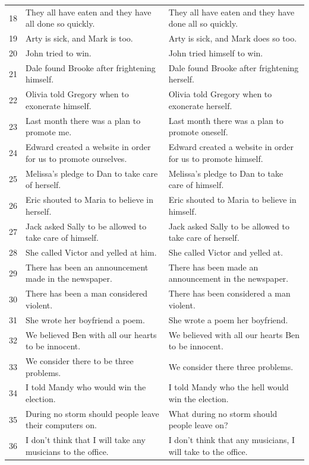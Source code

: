 \documentclass[doc]{apa6}
\begin{document}
\begin{small}
\begin{longtable}{p{1cm} | p{8.5cm} | p{8.5cm}}
18 & They all have eaten and they have all done so quickly. & They all have eaten and they have done all so quickly.\\
19 & Arty is sick, and Mark is too. & Arty is sick, and Mark does so too.\\
20 & John tried to win. & John tried himself to win.\\
21 & Dale found Brooke after frightening himself.  & Dale found Brooke after frightening herself. \\
22 & Olivia told Gregory when to exonerate himself. & Olivia told Gregory when to exonerate herself.\\
23 & Last month there was a plan to promote me. & Last month there was a plan to promote oneself.\\
24 & Edward created a website in order for us to promote ourselves. & Edward created a website in order for us to promote himself.\\
25 & Melissa's pledge to Dan to take care of herself. & Melissa's pledge to Dan to take care of himself.\\
26 & Eric shouted to Maria to believe in herself. & Eric shouted to Maria to believe in himself.\\
27 & Jack asked Sally to be allowed to take care of himself. & Jack asked Sally to be allowed to take care of herself.\\
28 & She called Victor and yelled at him. & She called Victor and yelled at.\\
29 & There has been an announcement made in the newspaper. & There has been made an announcement in the newspaper.\\
30 & There has been a man considered violent. & There has been considered a man violent.\\
31 & She wrote her boyfriend a poem. & She wrote a poem her boyfriend.\\
32 & We believed Ben with all our hearts to be innocent. & We believed with all our hearts Ben to be innocent.\\
33 & We consider there to be three problems. & We consider there three problems.\\
34 & I told Mandy who would win the election. & I told Mandy who the hell would win the election.\\
35 & During no storm should people leave their computers on. & What during no storm should people leave on?\\
36 & I don't think that I will take any musicians to the office. & I don't think that any musicians, I will take to the office.\\

\end{longtable}
\end{small}
\end{document}
